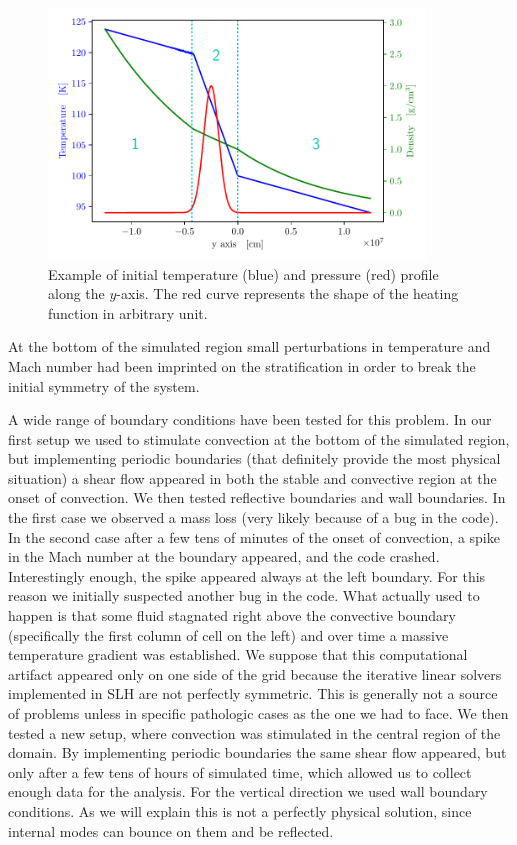 \begin{figure}[t]
\centering
\includegraphics[width=10cm]{./img/twin.pdf}
\caption{Example of initial temperature (blue) and pressure (red) profile along the $y$-axis. The red curve represents the shape of the heating function in arbitrary unit.}
\label{fig:twin}
\centering
\end{figure}
At the bottom of the simulated region small perturbations in temperature and Mach number had been imprinted on the stratification in order to break the initial symmetry of the system.

A wide range of boundary conditions have been tested for this problem. In our first setup we used to stimulate convection at the bottom of the simulated region, but implementing periodic boundaries (that definitely provide the most physical situation) a shear flow appeared in both the stable and convective region at the onset of convection. We then tested reflective boundaries and wall boundaries. In the first case we observed a mass loss (very likely because of a bug in the code). In the second case after a few tens of minutes of the onset of convection, a spike in the Mach number at the boundary appeared, and the code crashed. Interestingly enough, the spike appeared always at the left boundary. For this reason we initially suspected another bug in the code. What actually used to happen is that some fluid stagnated right above the convective boundary (specifically the first column of cell on the left) and over time a massive temperature gradient was established. We suppose that this computational artifact appeared only on one side of the grid because the iterative linear solvers implemented in SLH are not perfectly symmetric. This is generally not a source of problems unless in specific pathologic cases as the one we had to face. We then tested a new setup, where convection was stimulated in the central region of the domain. By implementing periodic boundaries the same shear flow appeared, but only after a few tens of hours of simulated time, which allowed us to collect enough data for the analysis. For the vertical direction we used wall boundary conditions. As we will explain this is not a perfectly physical solution, since internal modes can bounce on them and be reflected.

